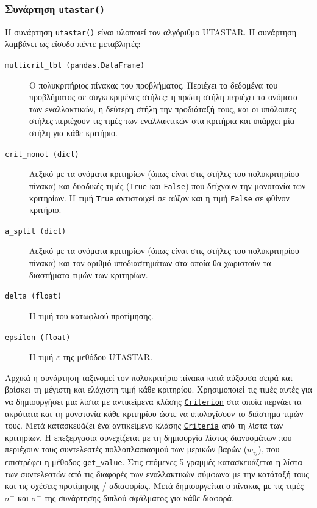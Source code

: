 \documentclass[11pt,a4paper,titlepage]{article}
\numberwithin{equation}{section}
\begin{document}
\subsubsection{Συνάρτηση \texttt{utastar()}}
\label{sssec:utastar()}
H συνάρτηση \texttt{utastar()} είναι υλοποιεί τον αλγόριθμο UTASTAR. H συνάρτηση λαμβάνει ως είσοδο πέντε μεταβλητές:
\begin{description}
    \item[\texttt{multicrit\_tbl (pandas.DataFrame)}]  
    Ο πολυκριτήριος πίνακας του προβλήματος. Περιέχει τα δεδομένα του προβλήματος σε συγκεκριμένες στήλες: η πρώτη στήλη περιέχει τα ονόματα των εναλλακτικών, η δεύτερη στήλη την προδιάταξή τους, και οι υπόλοιπες στήλες περιέχουν τις τιμές των εναλλακτικών στα κριτήρια και υπάρχει μία στήλη για κάθε κριτήριο.
    \item[\texttt{crit\_monot (dict)}]
    Λεξικό με τα ονόματα κριτηρίων (όπως είναι στις στήλες του πολυκριτηρίου πίνακα) και δυαδικές τιμές (\texttt{True} και \texttt{False}) που δείχνουν την μονοτονία των κριτηρίων. Η τιμή \texttt{True} αντιστοιχεί σε αύξον και η τιμή \texttt{False} σε φθίνον κριτήριο.
    \item[\texttt{a\_split (dict)}]
    Λεξικό με τα ονόματα κριτηρίων (όπως είναι στις στήλες του πολυκριτηρίου πίνακα) και τον αριθμό υποδιαστημάτων στα οποία θα χωριστούν τα διαστήματα τιμών των κριτηρίων.
    \item[\texttt{delta (float)}]
    Η τιμή του κατωφλιού προτίμησης.
    \item[\texttt{epsilon (float)}]
    Η τιμή $ \varepsilon $ της μεθόδου UTASTAR.
\end{description}

Αρχικά η συνάρτηση ταξινομεί τον πολυκριτήριο πίνακα κατά αύξουσα σειρά και βρίσκει τη μέγιστη και ελάχιστη τιμή κάθε κριτηρίου. Χρησιμοποιεί τις τιμές αυτές για να δημιουργήσει μια λίστα με αντικείμενα κλάσης
\hyperref[sssec:Criterion]{\texttt{Criterion}} στα οποία περνάει τα ακρότατα και τη μονοτονία κάθε κριτηρίου ώστε να υπολογίσουν το διάστημα τιμών τους. Μετά κατασκευάζει ένα αντικείμενο κλάσης \hyperref[sssec:Criteria]{\texttt{Criteria}} από τη λίστα των κριτηρίων. 
Η επεξεργασία συνεχίζεται με τη δημιουργία λίστας διανυσμάτων που περιέχουν τους συντελεστές πολλαπλασιασμού των μερικών βαρών ($ w_{ij} $), που επιστρέφει η μέθοδος \hyperlink{method:getvalue}{\texttt{get\_value}}. Στις επόμενες 5 γραμμές κατασκευάζεται η λίστα των συντελεστών από τις διαφορές των εναλλακτικών σύμφωνα με την κατάταξή τους και τις σχέσεις προτίμησης / αδιαφορίας. Μετά δημιουργείται ο πίνακας με τις τιμές $ σ^{+} $ και $ σ^{-} $ της συνάρτησης διπλού σφάλματος για κάθε διαφορά.
 
\end{document}
